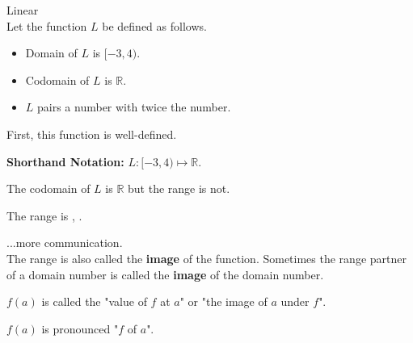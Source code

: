 \documentclass{ximera}
\begin{document}
\begin{example} Linear \\

Let the function $L$ be defined as follows.


\begin{itemize}
\item Domain of $L$ is $[-3, 4)$.
\item Codomain of $L$ is $\mathbb{R}$.
\item $L$ pairs a number with twice the number.
\end{itemize}


First, this function is well-defined. 


\textbf{Shorthand Notation: } $L: [-3, 4) \mapsto \mathbb{R}$.

\begin{question}

The codomain of $L$ is $\mathbb{R}$ but the range is not.  

The range is \wordChoice{\choice[correct]{[}\choice{(}}  ,  \wordChoice{\choice{]}\choice[correct]{)}}.

\end{question}



\end{example}
...more communication. \\



The range is also called the \textbf{image} of the function.   Sometimes the range partner of a domain number is called the \textbf{image} of the domain number.

$f(a)$ is called the "value of $f$ at $a$" or "the image of $a$ under $f$".


$f(a)$ is pronounced "$f$ of $a$".
\end{document}
